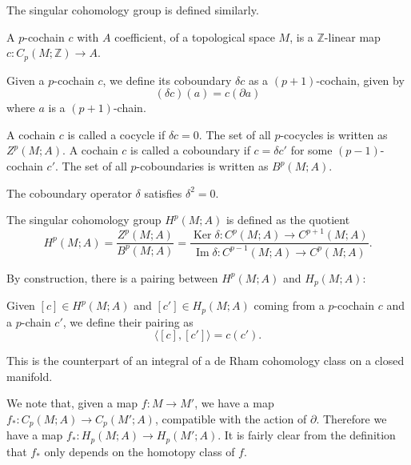 \documentclass[12pt]{article}
\numberwithin{equation}{section}
\theoremstyle{remark}
\def\bZ{\mathbb{Z}}
\def\Ker{\mathop{\mathrm{Ker}}}
\def\Im{\mathop{\mathrm{Im}}}
\begin{document}
The singular cohomology group is defined similarly. 
\begin{definition}
A $p$-cochain $c$ with $A$ coefficient, of a topological space $M$, is a $\bZ$-linear map $c:C_p(M;\bZ)\to A$.
\end{definition}

\begin{definition}
  Given a $p$-cochain $c$, we define its coboundary $\delta c$ as a $(p+1)$-cochain, given by \begin{equation}
    (\delta c)(a) = c(\partial a)
  \end{equation} where $a$ is a $(p+1)$-chain.
\end{definition}

\begin{definition}
A cochain $c$ is called a cocycle if $\delta c=0$.
The set of all $p$-cocycles is written as $Z^p(M;A)$.
A cochain $c$ is called a coboundary if $c=\delta c'$ for some $(p-1)$-cochain $c'$.
The set of all $p$-coboundaries is written as $B^p(M;A)$.
\end{definition}


\begin{proposition}
The coboundary operator $\delta$ satisfies $\delta^2=0$.
\end{proposition}

\begin{definition}
The singular cohomology group $H^p(M;A)$ is defined as the quotient \begin{equation}
H^p(M;A) = \frac{Z^p(M;A)}{B^p(M;A)} = \frac{\Ker \delta: C^p(M;A)\to C^{p+1}(M;A)}{\Im \delta: C^{p-1}(M;A)\to C^p(M;A)}.
\end{equation}
\end{definition}

By construction, there is a pairing between $H^p(M;A)$ and $H_p(M;A)$:
\begin{definition}
Given  $[c]\in H^p(M;A)$ and $[c']\in H_p(M;A)$
coming from a $p$-cochain $c$ and a $p$-chain $c'$,
we define their pairing as \begin{equation}
\langle [c],[c']\rangle = c(c').
\end{equation}
\end{definition}
This is the counterpart of an integral of a de Rham cohomology class on a closed manifold.

We note that, given a map $f:M\to M'$,
we have a map $f_*:C_p(M;A)\to C_p(M';A)$, 
compatible with the action of $\partial$.
Therefore we have a map $f_*: H_p(M;A)\to H_p(M';A)$.
It is fairly clear from the definition that $f_*$ only depends on the homotopy class of $f$.
\end{document}
